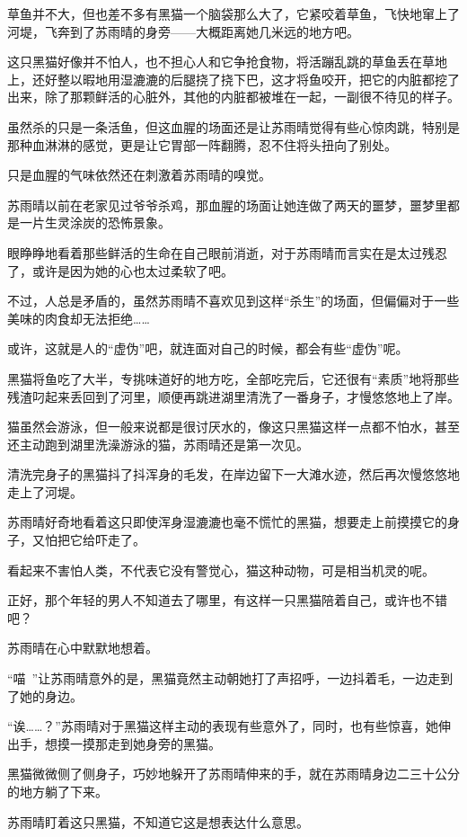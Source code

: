 草鱼并不大，但也差不多有黑猫一个脑袋那么大了，它紧咬着草鱼，飞快地窜上了河堤，飞奔到了苏雨晴的身旁——大概距离她几米远的地方吧。

这只黑猫好像并不怕人，也不担心人和它争抢食物，将活蹦乱跳的草鱼丢在草地上，还好整以暇地用湿漉漉的后腿挠了挠下巴，这才将鱼咬开，把它的内脏都挖了出来，除了那颗鲜活的心脏外，其他的内脏都被堆在一起，一副很不待见的样子。

虽然杀的只是一条活鱼，但这血腥的场面还是让苏雨晴觉得有些心惊肉跳，特别是那种血淋淋的感觉，更是让它胃部一阵翻腾，忍不住将头扭向了别处。

只是血腥的气味依然还在刺激着苏雨晴的嗅觉。

苏雨晴以前在老家见过爷爷杀鸡，那血腥的场面让她连做了两天的噩梦，噩梦里都是一片生灵涂炭的恐怖景象。

眼睁睁地看着那些鲜活的生命在自己眼前消逝，对于苏雨晴而言实在是太过残忍了，或许是因为她的心也太过柔软了吧。

不过，人总是矛盾的，虽然苏雨晴不喜欢见到这样“杀生”的场面，但偏偏对于一些美味的肉食却无法拒绝……

或许，这就是人的“虚伪”吧，就连面对自己的时候，都会有些“虚伪”呢。

黑猫将鱼吃了大半，专挑味道好的地方吃，全部吃完后，它还很有“素质”地将那些残渣叼起来丢回到了河里，顺便再跳进湖里清洗了一番身子，才慢悠悠地上了岸。

猫虽然会游泳，但一般来说都是很讨厌水的，像这只黑猫这样一点都不怕水，甚至还主动跑到湖里洗澡游泳的猫，苏雨晴还是第一次见。

清洗完身子的黑猫抖了抖浑身的毛发，在岸边留下一大滩水迹，然后再次慢悠悠地走上了河堤。

苏雨晴好奇地看着这只即使浑身湿漉漉也毫不慌忙的黑猫，想要走上前摸摸它的身子，又怕把它给吓走了。

看起来不害怕人类，不代表它没有警觉心，猫这种动物，可是相当机灵的呢。

正好，那个年轻的男人不知道去了哪里，有这样一只黑猫陪着自己，或许也不错吧？

苏雨晴在心中默默地想着。

“喵~”让苏雨晴意外的是，黑猫竟然主动朝她打了声招呼，一边抖着毛，一边走到了她的身边。

“诶……？”苏雨晴对于黑猫这样主动的表现有些意外了，同时，也有些惊喜，她伸出手，想摸一摸那走到她身旁的黑猫。

黑猫微微侧了侧身子，巧妙地躲开了苏雨晴伸来的手，就在苏雨晴身边二三十公分的地方躺了下来。

苏雨晴盯着这只黑猫，不知道它这是想表达什么意思。

